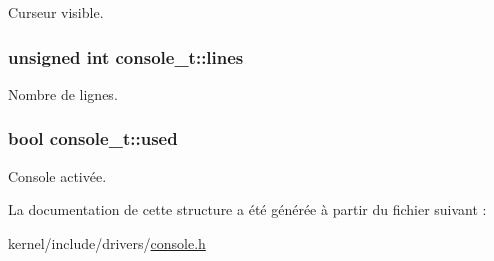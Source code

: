 \-Curseur visible. \hypertarget{structconsole__t_ada36635a93afd23c3eb88c856f218103}{
\subsubsection[{lines}]{\setlength{\rightskip}{0pt plus 5cm}unsigned int {\bf console\-\_\-t\-::lines}}}\label{structconsole__t_ada36635a93afd23c3eb88c856f218103}
\-Nombre de lignes. \hypertarget{structconsole__t_ad830edd689dced40135f6afa651677e3}{
\subsubsection[{used}]{\setlength{\rightskip}{0pt plus 5cm}bool {\bf console\-\_\-t\-::used}}}\label{structconsole__t_ad830edd689dced40135f6afa651677e3}
\-Console activée. 

\-La documentation de cette structure a été générée à partir du fichier suivant \-:\begin{DoxyCompactItemize}
\item 
kernel/include/drivers/\hyperlink{console_8h}{console.\-h}\end{DoxyCompactItemize}
